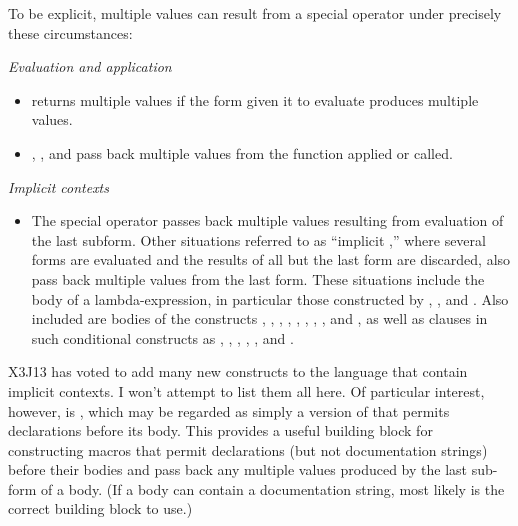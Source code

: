 To be explicit, multiple values can result from a special operator
under precisely these circumstances:
\begin{flushdesc}
\item[\emph{Evaluation and application}]\leavevmode
\begin{itemize}
\item
{} returns multiple values if the form given it to
evaluate produces multiple values.

\item
{}, , and 
pass back multiple values from the function applied or called.
\end{itemize}

\item[\emph{Implicit \cdf{progn} contexts}]\leavevmode
\begin{itemize}
\item
The special operator 
passes back multiple values resulting from evaluation of the
last subform.  Other situations referred to as ``implicit ,''
where several forms are evaluated and the results of all but the last form
are discarded, also pass back multiple values from the last form.
These situations include the body of a lambda-expression,
in particular those constructed by ,
, and .
Also included are bodies of the constructs
,
, ,
, , ,
,
, and ,
as well as clauses in such conditional
constructs as
, ,
, , , and .
\end{itemize}
\end{flushdesc}

\begin{new}
X3J13 has voted to add many new constructs to the language that contain
implicit  contexts.  I won't attempt to list them all here.
Of particular interest, however, is , which may be regarded
as simply a version of  that permits declarations before its
body.  This provides a useful building block for constructing macros
that permit declarations (but not documentation strings)
before their bodies and pass back any multiple values
produced by the last sub-form of a body.  (If a body can contain a documentation
string, most likely  is the correct building block to use.)
\end{new}

